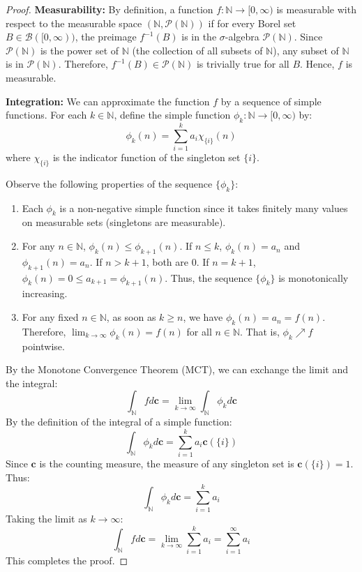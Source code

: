 \documentclass[11pt]{article}
\begin{document}
\begin{proof}
\textbf{Measurability:} 
By definition, a function $f: \mathbb{N} \to [0, \infty)$ is measurable with respect to the measurable space $(\mathbb{N}, \mathcal{P}(\mathbb{N}))$ if for every Borel set $B \in \mathcal{B}([0, \infty))$, the preimage $f^{-1}(B)$ is in the $\sigma$-algebra $\mathcal{P}(\mathbb{N})$. Since $\mathcal{P}(\mathbb{N})$ is the power set of $\mathbb{N}$ (the collection of all subsets of $\mathbb{N}$), any subset of $\mathbb{N}$ is in $\mathcal{P}(\mathbb{N})$. Therefore, $f^{-1}(B) \in \mathcal{P}(\mathbb{N})$ is trivially true for all $B$. Hence, $f$ is measurable.

\vspace{0.5em}
\noindent\textbf{Integration:}
We can approximate the function $f$ by a sequence of simple functions. For each $k \in \mathbb{N}$, define the simple function $\phi_k: \mathbb{N} \to [0, \infty)$ by:
\[ \phi_k(n) = \sum_{i=1}^{k} a_i \chi_{\{i\}}(n) \]
where $\chi_{\{i\}}$ is the indicator function of the singleton set $\{i\}$.

Observe the following properties of the sequence $\{\phi_k\}$:
\begin{enumerate}
    \item Each $\phi_k$ is a non-negative simple function since it takes finitely many values on measurable sets (singletons are measurable).
    \item For any $n \in \mathbb{N}$, $\phi_k(n) \le \phi_{k+1}(n)$. If $n \le k$, $\phi_k(n) = a_n$ and $\phi_{k+1}(n) = a_n$. If $n > k+1$, both are $0$. If $n = k+1$, $\phi_k(n) = 0 \le a_{k+1} = \phi_{k+1}(n)$. Thus, the sequence $\{\phi_k\}$ is monotonically increasing.
    \item For any fixed $n \in \mathbb{N}$, as soon as $k \ge n$, we have $\phi_k(n) = a_n = f(n)$. Therefore, $\lim_{k \to \infty} \phi_k(n) = f(n)$ for all $n \in \mathbb{N}$. That is, $\phi_k \nearrow f$ pointwise.
\end{enumerate}

By the Monotone Convergence Theorem (MCT), we can exchange the limit and the integral:
\[ \int_{\mathbb{N}} f d\mathbf{c} = \lim_{k \to \infty} \int_{\mathbb{N}} \phi_k d\mathbf{c} \]
By the definition of the integral of a simple function:
\[ \int_{\mathbb{N}} \phi_k d\mathbf{c} = \sum_{i=1}^{k} a_i \mathbf{c}(\{i\}) \]
Since $\mathbf{c}$ is the counting measure, the measure of any singleton set is $\mathbf{c}(\{i\}) = 1$. Thus:
\[ \int_{\mathbb{N}} \phi_k d\mathbf{c} = \sum_{i=1}^{k} a_i \]
Taking the limit as $k \to \infty$:
\[ \int_{\mathbb{N}} f d\mathbf{c} = \lim_{k \to \infty} \sum_{i=1}^{k} a_i = \sum_{i=1}^{\infty} a_i \]
This completes the proof.
\end{proof}
\end{document}
